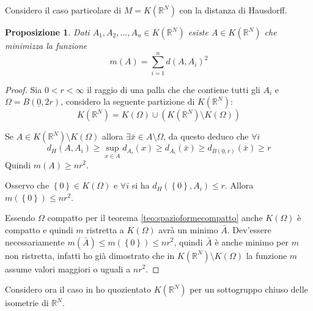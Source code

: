 \documentclass[a4paper,10pt]{article}
\newcounter{counter1}
\theoremstyle{plain}
\newtheorem{mypro}[counter1]{Proposizione}
\theoremstyle{definition}
\theoremstyle{remark}
\newcommand{\ubar}[1]{\underline{#1}}
\newcommand{\set}[1]{\left\{#1\right\}}
\newcommand{\pa}[1]{\left(#1\right)}
\begin{document}
Considero il caso particolare di $M = K(\mathbb{R}^N)$ con la distanza
di Hausdorff.

\begin{mypro}
  Dati $A_1, A_2,..., A_n \in K(\mathbb{R}^N)$ esiste $A \in
  K(\mathbb{R}^N)$ che minimizza la funzione
  \[ m(A) = \sum _{i =1} ^n d(A,A_i)^2 \]
\end{mypro}
\begin{proof}
  Sia $0 < r< \infty$ il raggio di una palla che che contiene tutti
  gli $A_i$ e $\Omega = B(\ubar{0},2r)$, considero la seguente
  partizione di $K(\mathbb{R}^N)$:
  \[ K(\mathbb{R}^N) = K(\Omega) \cup \pa{ K(\mathbb{R}^N) \setminus
    K(\Omega)} \]

  Se $A \in K(\mathbb{R}^N) \setminus K(\Omega)$ allora $\exists \bar
  x \in A \setminus \Omega$, da questo deduco che $\forall i$
  \[ d_H(A,A_i) \ge \sup _{x\in A} d_{A_i} (x) \ge d_{A_i} (\bar x)
  \ge d_{B(\ubar{0},r)} (\bar x) \ge r \]
  Quindi $m(A) \ge nr^2$.

  Osservo che $\set{0} \in K(\Omega)$ e $\forall i$ si ha
  $d_H(\set{0},A_i) \le r$. Allora $m(\set{0}) \le nr^2$.

  Essendo $\Omega$ compatto per il teorema
  \ref{teo:spazioformecompatto} anche $K(\Omega)$ è compatto e quindi
  $m$ ristretta a $K(\Omega)$ avrà un minimo $\bar A$. Dev'essere
  necessariamente $m(\bar A) \le m(\set{0}) \le nr^2$, quindi $\bar A$
  è anche minimo per $m$ non ristretta, infatti ho già dimostrato che
  in $K(\mathbb{R}^N) \setminus K(\Omega)$ la funzione $m$ assume
  valori maggiori o uguali a $nr^2$.
\end{proof}

Considero ora il caso in ho quozientato $K(\mathbb{R}^N)$ per un
sottogruppo chiuso delle isometrie di $\mathbb{R}^N$.
\end{document}
